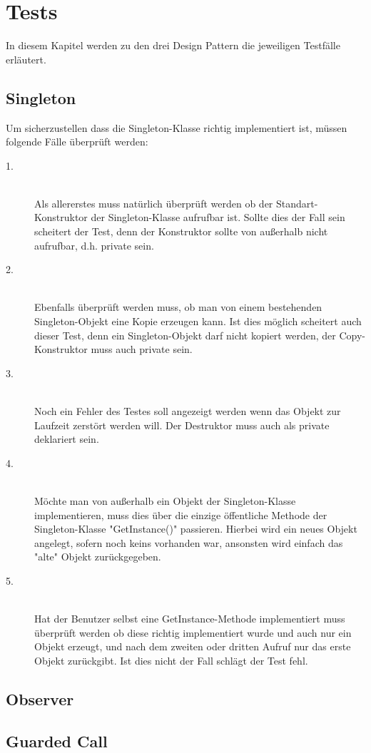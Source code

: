 \chapter{Tests}

In diesem Kapitel werden zu den drei Design Pattern die jeweiligen Testfälle erläutert.

\section{Singleton}

Um sicherzustellen dass die Singleton-Klasse richtig implementiert ist, müssen folgende Fälle überprüft werden: 

\begin{description}
  \item[1.] \hfill \\
  Als allererstes muss natürlich überprüft werden ob der Standart-Konstruktor der 	Singleton-Klasse aufrufbar ist. Sollte dies der Fall sein scheitert der Test, denn der Konstruktor sollte von außerhalb nicht aufrufbar, d.h. private sein.
  \item[2.] \hfill \\
  Ebenfalls überprüft werden muss, ob man von einem bestehenden Singleton-Objekt eine Kopie erzeugen kann. Ist dies möglich scheitert auch dieser Test, denn ein Singleton-Objekt darf nicht kopiert werden, der Copy-Konstruktor muss auch private sein.
  \item[3.] \hfill \\
  Noch ein Fehler des Testes soll angezeigt werden wenn das Objekt zur Laufzeit zerstört werden will. Der Destruktor muss auch als private deklariert sein.
  \item[4.] \hfill \\
  Möchte man von außerhalb ein Objekt der Singleton-Klasse implementieren, muss dies über die einzige öffentliche Methode der Singleton-Klasse "GetInstance()" passieren. Hierbei wird ein neues Objekt angelegt, sofern noch keins vorhanden war, ansonsten wird einfach das "alte" Objekt zurückgegeben.
  \item[5.] \hfill \\
  Hat der Benutzer selbst eine GetInstance-Methode implementiert muss überprüft werden ob diese richtig implementiert wurde und auch nur ein Objekt erzeugt, und nach dem zweiten oder dritten Aufruf nur das erste Objekt zurückgibt. Ist dies nicht der Fall schlägt der Test fehl.
\end{description}

\section{Observer}

\section{Guarded Call}


